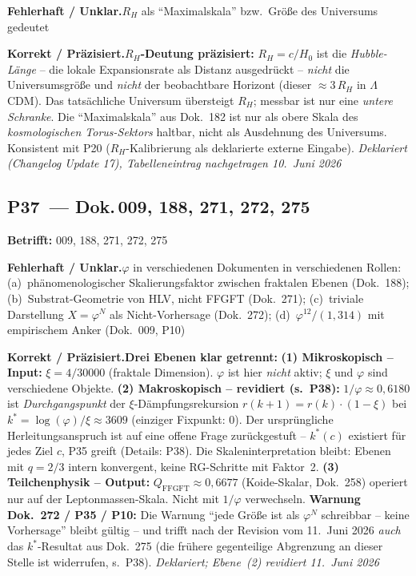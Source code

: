 \smallskip\noindent\textbf{Fehlerhaft / Unklar.}\quad $R_H$ als \enquote{Maximalskala} bzw.\ Größe des Universums gedeutet


\smallskip\noindent\textbf{Korrekt / Präzisiert.}\quad \textbf{$R_H$-Deutung präzisiert:} $R_H = c/H_0$ ist die \emph{Hubble-Länge} -- die lokale Expansionsrate als Distanz ausgedrückt -- \emph{nicht} die Universumsgröße und \emph{nicht} der beobachtbare Horizont (dieser $\approx 3\,R_H$ in $\Lambda$CDM). Das tatsächliche Universum übersteigt $R_H$; messbar ist nur eine \emph{untere Schranke}. Die \enquote{Maximalskala} aus Dok.~182 ist nur als obere Skala des \emph{kosmologischen Torus-Sektors} haltbar, nicht als Ausdehnung des Universums. Konsistent mit P20 ($R_H$-Kalibrierung als deklarierte externe Eingabe). \emph{Deklariert (Changelog Update 17), Tabelleneintrag nachgetragen 10.~Juni 2026}


\medskip


\subsection*{P37~--- Dok.\,009, 188, 271, 272, 275}

\noindent\textbf{Betrifft:} 009, 188, 271, 272, 275


\smallskip\noindent\textbf{Fehlerhaft / Unklar.}\quad $\varphi$ in verschiedenen Dokumenten in verschiedenen Rollen: (a)~phänomenologischer Skalierungsfaktor zwischen fraktalen Ebenen (Dok.~188); (b)~Substrat-Geometrie von HLV, nicht FFGFT (Dok.~271); (c)~triviale Darstellung $X=\varphi^N$ als Nicht-Vorhersage (Dok.~272); (d)~$\varphi^{12}/(1{,}314)$ mit empirischem Anker (Dok.~009, P10)


\smallskip\noindent\textbf{Korrekt / Präzisiert.}\quad \textbf{Drei Ebenen klar getrennt:}
  \newline
  \textbf{(1) Mikroskopisch -- Input:} $\xi = 4/30000$ (fraktale Dimension). $\varphi$ ist hier \emph{nicht} aktiv; $\xi$ und $\varphi$ sind verschiedene Objekte.
  \newline
  \textbf{(2) Makroskopisch -- revidiert (s.\ P38):} $1/\varphi \approx 0{,}6180$ ist \emph{Durchgangspunkt} der $\xi$-Dämpfungsrekursion $r(k+1)=r(k)\cdot(1-\xi)$ bei $k^* = \log(\varphi)/\xi \approx 3609$ (einziger Fixpunkt: $0$). Der ursprüngliche Herleitungsanspruch ist auf eine offene Frage zurückgestuft -- $k^*(c)$ existiert für jedes Ziel $c$, P35 greift (Details: P38). Die Skaleninterpretation bleibt: Ebenen mit $q=2/3$ intern konvergent, keine RG-Schritte mit Faktor~2.
  \newline
  \textbf{(3) Teilchenphysik -- Output:} $Q_\mathrm{FFGFT}\approx 0{,}6677$ (Koide-Skalar, Dok.~258) operiert nur auf der Leptonmassen-Skala. Nicht mit $1/\varphi$ verwechseln.
  \newline
  \textbf{Warnung Dok.~272 / P35 / P10:} Die Warnung \enquote{jede Größe ist als $\varphi^N$ schreibbar -- keine Vorhersage} bleibt gültig -- und trifft nach der Revision vom 11.~Juni 2026 \emph{auch} das $k^*$-Resultat aus Dok.~275 (die frühere gegenteilige Abgrenzung an dieser Stelle ist widerrufen, s.\ P38). \emph{Deklariert; Ebene~(2) revidiert 11.~Juni 2026}



